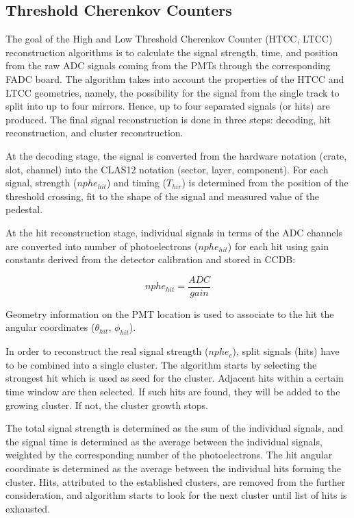\subsection{Threshold Cherenkov Counters}

The goal of the High and Low Threshold Cherenkov Counter (HTCC, LTCC) reconstruction algorithms is to
calculate the signal strength, time, and position from the
raw ADC signals coming from the PMTs through the corresponding FADC board. The algorithm takes into account
the properties of the HTCC and LTCC geometries, namely, the possibility for the signal from the single track to split into
up to four mirrors.
Hence, up to four separated signals (or hits) are produced. The final signal reconstruction is done in three
steps: decoding, hit reconstruction, and cluster reconstruction.

At the decoding stage, the signal is converted from the hardware notation (crate, slot, channel) into the CLAS12
notation (sector, layer, component).  For each signal, strength ($nphe_{hit}$) and timing ($T_{hir}$) is determined
from the position of the threshold crossing, fit to the shape of the signal and measured value of the pedestal.

At the hit reconstruction stage, individual signals in terms of the ADC channels are converted into number of photoelectrons ($nphe_{hit}$) for each hit using gain constants derived from the detector calibration and stored in CCDB:

\begin{equation}
nphe_{hit} = \frac{ADC}{gain}
\end{equation}

Geometry information on the PMT location is used to associate to the hit the angular coordinates ($\theta_{hit}$, $\phi_{hit}$).

In order to reconstruct the real signal strength ($nphe_c$),  split signals (hits) have to be combined into a single
cluster. The algorithm starts by selecting the strongest hit which is used as seed for the cluster. Adjacent hits within a certain time window are then selected. If such hits are found, they will be added to the growing cluster. If not, the cluster growth stops.

The total signal strength is determined as the sum of the individual signals, and the signal time is determined as
the average between the individual signals, weighted by the corresponding number of the photoelectrons. The hit
angular coordinate is determined as the average between the individual hits forming the cluster.  Hits, attributed
to the established clusters, are removed from the further consideration, and algorithm starts to look for the next
cluster until list of hits is exhausted.

